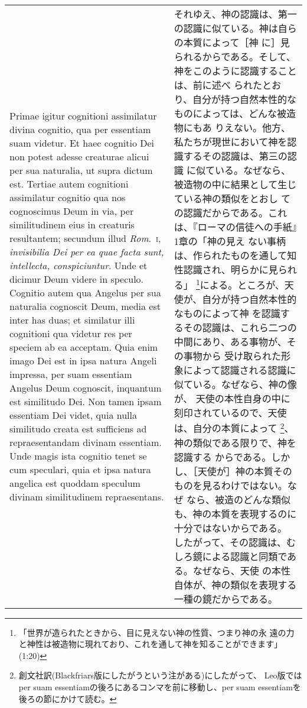 \documentclass[10pt]{jsarticle} %
\begin{document}
\begin{longtable}{p{21em}p{21em}}
Primae igitur cognitioni assimilatur divina cognitio, qua per
essentiam suam videtur. Et haec cognitio Dei non potest adesse
creaturae alicui per sua naturalia, ut supra dictum est. Tertiae autem
cognitioni assimilatur cognitio qua nos cognoscimus Deum in via, per
similitudinem eius in creaturis resultantem; secundum illud {\itshape
Rom}.~{\scshape i}, {\itshape invisibilia Dei per ea quae facta sunt,
intellecta, conspiciuntur}. Unde et dicimur Deum videre in
speculo. Cognitio autem qua Angelus per sua naturalia cognoscit Deum,
media est inter has duas; et similatur illi cognitioni qua videtur res
per speciem ab ea acceptam. Quia enim imago Dei est in ipsa natura
Angeli impressa, per suam essentiam Angelus Deum cognoscit, inquantum
est similitudo Dei. Non tamen ipsam essentiam Dei videt, quia nulla
similitudo creata est sufficiens ad repraesentandam divinam
essentiam. Unde magis ista cognitio tenet se cum speculari, quia et
ipsa natura angelica est quoddam speculum divinam similitudinem
repraesentans.


&


それゆえ、神の認識は、第一の認識に似ている。神は自らの本質によって［神
に］見られるからである。そして、神をこのように認識することは、前に述べ
られたとおり、自分が持つ自然本性的なものによっては、どんな被造物にもあ
りえない。他方、私たちが現世において神を認識するその認識は、第三の認識
に似ている。なぜなら、被造物の中に結果として生じている神の類似をとおし
ての認識だからである。これは、『ローマの信徒への手紙』1章の「神の見え
ない事柄は、作られたものを通して知性認識され、明らかに見られる」
\footnote{「世界が造られたときから、目に見えない神の性質、つまり神の永
遠の力と神性は被造物に現れており、これを通して神を知ることができます」
(1:20)}による。ところが、天使が、自分が持つ自然本性的なものによって神
を認識するその認識は、これら二つの中間にあり、ある事物が、その事物から
受け取られた形象によって認識される認識に似ている。なぜなら、神の像が、
天使の本性自身の中に刻印されているので、天使は、自分の本質によって
\footnote{創文社訳(Blackfriars版にしたがうという注がある)にしたがって、
Leo版ではper suam essentiamの後ろにあるコンマを前に移動し、per suam
essentiamを後ろの節にかけて読む。}、神の類似である限りで、神を認識する
からである。しかし、［天使が］神の本質そのものを見るわけではない。なぜ
なら、被造のどんな類似も、神の本質を表現するのに十分ではないからである。
したがって、その認識は、むしろ鏡による認識と同類である。なぜなら、天使
の本性自体が、神の類似を表現する一種の鏡だからである。

\\



\end{longtable}
\end{document}
